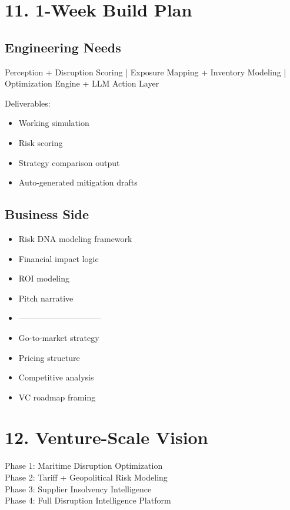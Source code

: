 \documentclass[11pt]{article}
\begin{document}
\section*{11. 1-Week Build Plan}

\subsection*{Engineering Needs}

Perception + Disruption Scoring |
Exposure Mapping + Inventory Modeling |
Optimization Engine + LLM Action Layer  

Deliverables:
\begin{itemize}
    \item Working simulation
    \item Risk scoring
    \item Strategy comparison output
    \item Auto-generated mitigation drafts
\end{itemize}

\subsection*{Business Side}

\begin{itemize}
    \item Risk DNA modeling framework
    \item Financial impact logic
    \item ROI modeling
    \item Pitch narrative
    \item ------------------------------
    \item Go-to-market strategy
    \item Pricing structure
    \item Competitive analysis
    \item VC roadmap framing
\end{itemize}

\section*{12. Venture-Scale Vision}

Phase 1: Maritime Disruption Optimization  \\
Phase 2: Tariff + Geopolitical Risk Modeling  \\
Phase 3: Supplier Insolvency Intelligence  \\
Phase 4: Full Disruption Intelligence Platform  \\
\end{document}
